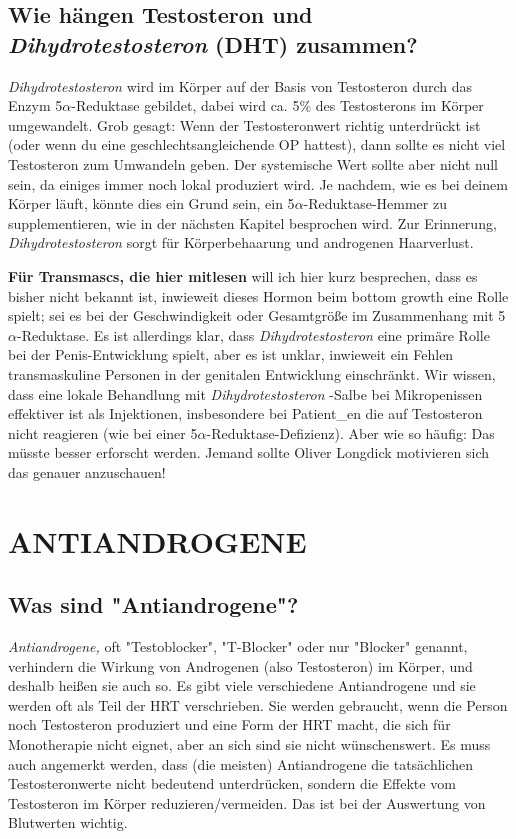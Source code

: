 \documentclass{article}
\begin{document}
\subsection{Wie hängen Testosteron und \textit{Dihydrotestosteron} (DHT) zusammen?}

\textit{Dihydrotestosteron} wird im Körper auf der Basis von Testosteron durch das Enzym 5$\alpha$-Reduktase gebildet, dabei wird ca. 5\% des Testosterons im Körper umgewandelt. Grob gesagt: Wenn der Testosteronwert richtig unterdrückt ist (oder wenn du eine geschlechtsangleichende OP hattest), dann sollte es nicht viel Testosteron zum Umwandeln geben. Der systemische Wert sollte aber nicht null sein, da einiges immer noch lokal produziert wird. Je nachdem, wie es bei deinem Körper läuft, könnte dies ein Grund sein, ein 5$\alpha$-Reduktase-Hemmer zu supplementieren, wie in der nächsten Kapitel besprochen wird. Zur Erinnerung, \textit{Dihydrotestosteron }sorgt für Körperbehaarung und androgenen Haarverlust.

\textbf{Für Transmascs, die hier mitlesen} will ich hier kurz besprechen, dass es bisher nicht bekannt ist, inwieweit dieses Hormon beim bottom growth eine Rolle spielt; sei es bei der Geschwindigkeit oder Gesamtgröße im Zusammenhang mit 5$\alpha$-Reduktase. Es ist allerdings klar, dass \textit{Dihydrotestosteron }eine primäre Rolle bei der Penis-Entwicklung spielt, aber es ist unklar, inwieweit ein Fehlen transmaskuline Personen in der genitalen Entwicklung einschränkt. Wir wissen, dass eine lokale Behandlung mit \textit{Dihydrotestosteron }-Salbe bei Mikropenissen effektiver ist als Injektionen, insbesondere bei Patient\_en die auf Testosteron nicht reagieren (wie bei einer 5$\alpha$-Reduktase-Defizienz). Aber wie so häufig: Das müsste besser erforscht werden. Jemand sollte Oliver Longdick motivieren sich das genauer anzuschauen!

 

\section{ANTIANDROGENE}\label{AA}

\subsection{Was sind "Antiandrogene"?}

\textit{Antiandrogene, }oft "Testoblocker", "T-Blocker"  oder nur "Blocker" genannt, verhindern die Wirkung von Androgenen (also Testosteron) im Körper, und deshalb heißen sie auch so. Es gibt viele verschiedene Antiandrogene und sie werden oft als Teil der HRT verschrieben. Sie werden gebraucht, wenn die Person noch Testosteron produziert und eine Form der HRT macht, die sich für Monotherapie nicht eignet, aber an sich sind sie nicht wünschenswert. Es muss auch angemerkt werden, dass (die meisten) Antiandrogene die tatsächlichen Testosteronwerte nicht bedeutend unterdrücken, sondern die Effekte vom Testosteron im Körper reduzieren/vermeiden. Das ist bei der Auswertung von Blutwerten wichtig.
\end{document}
